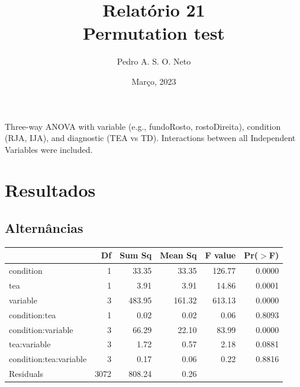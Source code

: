 \documentclass{article}
\title{Relatório 21 \\ Permutation test}
\author{Pedro A. S. O. Neto}
\date{Março, 2023}
\begin{document}
\maketitle

Three-way ANOVA with variable (e.g., fundoRosto, rostoDireita), condition (RJA, IJA), and diagnostic (TEA vs TD).
Interactions between all Independent Variables were included.

\section{Resultados}

\subsection{Alternâncias}

\begin{table}[ht]
\centering
\begin{tabular}{lrrrrr}
  \hline
 & Df & Sum Sq & Mean Sq & F value & Pr($>$F) \\ 
  \hline
condition              & 1 & 33.35 & 33.35 & 126.77 & 0.0000 \\ 
  tea                    & 1 & 3.91 & 3.91 & 14.86 & 0.0001 \\ 
  variable               & 3 & 483.95 & 161.32 & 613.13 & 0.0000 \\ 
  condition:tea          & 1 & 0.02 & 0.02 & 0.06 & 0.8093 \\ 
  condition:variable     & 3 & 66.29 & 22.10 & 83.99 & 0.0000 \\ 
  tea:variable           & 3 & 1.72 & 0.57 & 2.18 & 0.0881 \\ 
  condition:tea:variable & 3 & 0.17 & 0.06 & 0.22 & 0.8816 \\ 
  Residuals              & 3072 & 808.24 & 0.26 &  &  \\ 
   \hline
\end{tabular}
\end{table}
\end{document}
